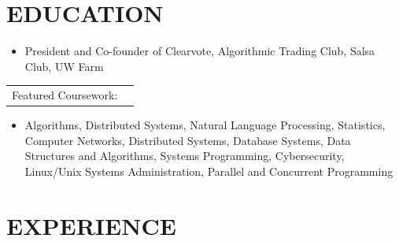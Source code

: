 \documentclass[10.5pt,letterpaper]{article}
\begin{document}
\vspace{-10pt}

\section{\faGraduationCap{ }EDUCATION}
\vspace{4pt}
\begin{itemize}[leftmargin=1.5em, nosep, noitemsep] %
  \item[] President and Co-founder of Clearvote, Algorithmic Trading Club, Salsa Club, UW Farm
\end{itemize}
\begin{tabularx}{\textwidth}{lX}
  Featured Coursework: & \\ 
\end{tabularx}
\begin{itemize}[leftmargin=1.5em, nosep, noitemsep] %
  \item[] 
  Algorithms, 
  Distributed Systems, 
  Natural Language Processing, 
  Statistics,
  Computer Networks,
  Distributed Systems,
  Database Systems,
  Data Structures and Algorithms,
  Systems Programming,
  Cybersecurity,
  Linux/Unix Systems Administration,
  Parallel and Concurrent Programming
\end{itemize}
\vspace{-20pt}

\section{\faCode{ }EXPERIENCE}
\vspace{4pt}



% 
\vspace{-10pt}
\end{document}
